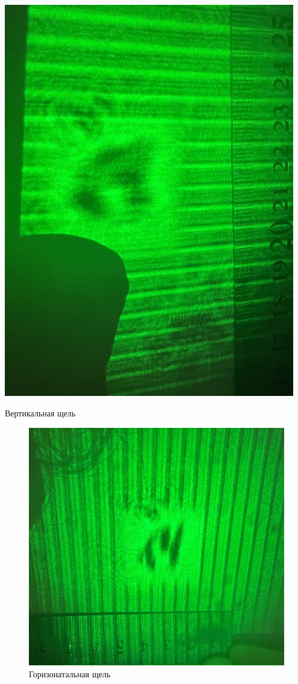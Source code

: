\documentclass[12pt,a4paper]{article}
\begin{document}
\begin{minipage}{0.47\textwidth}
\begin{center}
\includegraphics[width = 0.95\textwidth]{src/ver.jpeg}
\end{center}

\begin{center}
Вертикальная щель
\end{center}
\end{minipage}

		\begin{figure}
			\centering
			\includegraphics[width=0.75\linewidth]{src/hor.jpeg}
			\caption{Горизонатальная щель}
		\end{figure}
\end{document}
